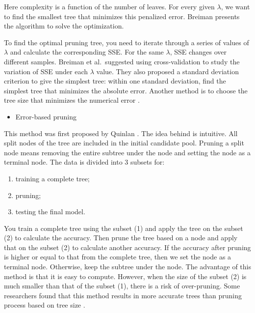 \documentclass[12pt,]{krantz}
\providecommand{\tightlist}{%
  \setlength{\itemsep}{0pt}\setlength{\parskip}{0pt}}
\begin{document}
Here complexity is a function of the number of leaves. For every given \(\lambda\), we want to find the smallest tree that minimizes this penalized error. Breiman presents the algorithm to solve the optimization\citep{Breiman1984}.

To find the optimal pruning tree, you need to iterate through a series of values of \(\lambda\) and calculate the corresponding SSE. For the same \(\lambda\), SSE changes over different samples. Breiman et al.~suggested using cross-validation \citep{Breiman1984} to study the variation of SSE under each \(\lambda\) value. They also proposed a standard deviation criterion to give the simplest tree: within one standard deviation, find the simplest tree that minimizes the absolute error. Another method is to choose the tree size that minimizes the numerical error \citep{Hastie2008}.

\begin{itemize}
\tightlist
\item
  Error-based pruning
\end{itemize}

This method was first proposed by Quinlan \citep{Quinlan1999}. The idea behind is intuitive. All split nodes of the tree are included in the initial candidate pool. Pruning a split node means removing the entire subtree under the node and setting the node as a terminal node. The data is divided into 3 subsets for:

\begin{enumerate}
\def\labelenumi{(\arabic{enumi})}
\item
  training a complete tree;
\item
  pruning;
\item
  testing the final model.
\end{enumerate}

You train a complete tree using the subset (1) and apply the tree on the subset (2) to calculate the accuracy. Then prune the tree based on a node and apply that on the subset (2) to calculate another accuracy. If the accuracy after pruning is higher or equal to that from the complete tree, then we set the node as a terminal node. Otherwise, keep the subtree under the node. The advantage of this method is that it is easy to compute. However, when the size of the subset (2) is much smaller than that of the subset (1), there is a risk of over-pruning. Some researchers found that this method results in more accurate trees than pruning process based on tree size \citep{Espoito1997}.
\end{document}
